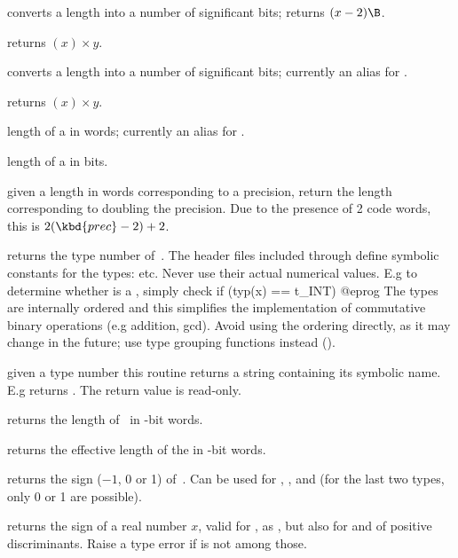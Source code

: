  converts a  length into a number
of significant bits; returns $(x - 2)\B$.

 returns
$(x)\times y$.

 converts a length into a number
of significant bits; currently an alias for .

 returns
$(x)\times y$.

 length of a  in words; currently an alias
for .

 length of a  in bits.

 given a length in words corresponding to a
 precision, return the length corresponding to doubling the
precision. Due to the presence of 2 code words, this is
 $2(\kbd{prec} - 2) + 2$.


 returns the type number of~. The header files
included through  define symbolic constants for the 
types:  etc. Never use their actual numerical values. E.g to determine
whether  is a , simply check
\bprog
  if (typ(x) == t_INT) { }
@eprog\noindent
The types are internally ordered and this simplifies the implementation of
commutative binary operations (e.g addition, gcd). Avoid using the ordering
directly, as it may change in the future; use type grouping functions
instead ().

 given a type number  this routine
returns a string containing its symbolic name. E.g 
returns . The return value is read-only.

 returns the length of~ in \B-bit words.

 returns the effective length of the 
 in \B-bit words.

 returns the sign ($-1$, 0 or 1) of~. Can be
used for , ,  and  (for the last two
types, only 0 or 1 are possible).

 returns the sign of a real number $x$,
valid for ,  as , but also for 
and  of positive discriminants. Raise a type error if 
is not among those.


